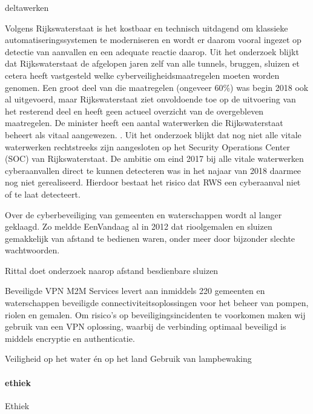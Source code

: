 \cite{hackerWaterwerk}
deltawerken

\cite{kramerZeeland}
Volgens Rijkswaterstaat is het kostbaar en technisch uitdagend om klassieke automatiseringssystemen te moderniseren en wordt er daarom vooral ingezet op detectie van aanvallen en een adequate reactie daarop.
Uit het onderzoek blijkt dat Rijkswaterstaat de afgelopen jaren zelf van alle tunnels, bruggen, sluizen et cetera heeft vastgesteld welke cyberveiligheidsmaatregelen moeten worden genomen. Een groot deel van die maatregelen (ongeveer 60\%) was begin 2018 ook al uitgevoerd, maar Rijkswaterstaat ziet onvoldoende toe op de uitvoering van het resterend deel en heeft geen actueel overzicht van de overgebleven maatregelen.
De minister heeft een aantal waterwerken die Rijkswaterstaat beheert als vitaal aangewezen. . Uit het onderzoek blijkt dat nog niet alle vitale waterwerken rechtstreeks zijn aangesloten op het Security Operations Center (SOC) van Rijkswaterstaat. De ambitie om eind 2017 bij alle vitale waterwerken cyberaanvallen direct te kunnen detecteren was in het najaar van 2018 daarmee nog niet gerealiseerd. Hierdoor bestaat het risico dat RWS een cyberaanval niet of te laat detecteert.

\cite{cybersecWaterwerk}
Over de cyberbeveiliging van gemeenten en waterschappen wordt al langer geklaagd. Zo meldde EenVandaag al in 2012 dat rioolgemalen en sluizen gemakkelijk van afstand te bedienen waren, onder meer door bijzonder slechte wachtwoorden.

\cite{cybersecWaterschappen}
Rittal doet onderzoek naarop afstand besdienbare sluizen

\cite{cybersecZuidHolland}
Beveiligde VPN
M2M Services levert aan inmiddels 220 gemeenten en waterschappen beveiligde connectiviteitsoplossingen voor het beheer van pompen, riolen en gemalen. Om risico’s op beveiligingsincidenten te voorkomen maken wij gebruik van een VPN oplossing, waarbij de verbinding optimaal beveiligd is middels encryptie en authenticatie.

\cite{waterwerkNED}
Veiligheid op het water én op het land
Gebruik van lampbewaking 

\cite{veiligheidwaterland} 



\paragraph{ethiek}


Ethiek 



